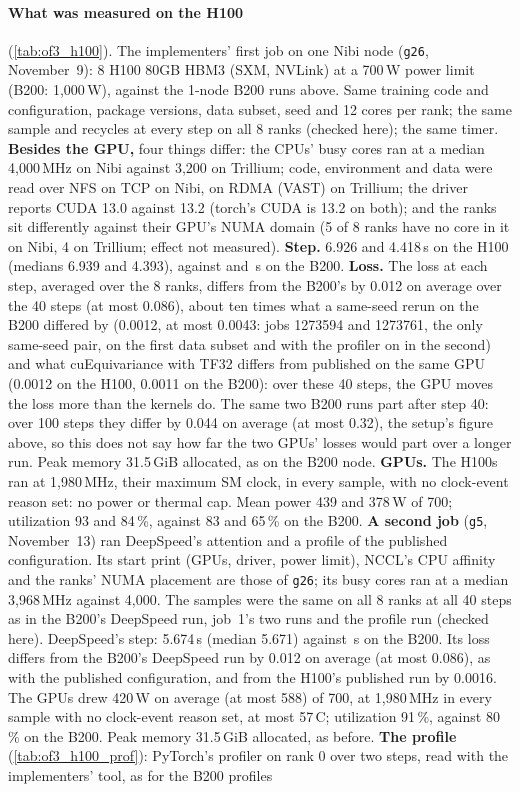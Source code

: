\paragraph{What was measured on the H100} (\cref{tab:of3_h100}). The implementers' first job on one Nibi node (\texttt{g26}, November~9): 8 H100 80GB HBM3 (SXM, NVLink) at a 700\,W power limit (B200: 1,000\,W), against the 1-node B200 runs above. Same training code and configuration, package versions, data subset, seed and 12 cores per rank; the same sample and recycles at every step on all 8 ranks (checked here); the same timer. \textbf{Besides the GPU,} four things differ: the CPUs' busy cores ran at a median 4,000\,MHz on Nibi against 3,200 on Trillium; code, environment and data were read over NFS on TCP on Nibi, on RDMA (VAST) on Trillium; the driver reports CUDA 13.0 against 13.2 (torch's CUDA is 13.2 on both); and the ranks sit differently against their GPU's NUMA domain (5 of 8 ranks have no core in it on Nibi, 4 on Trillium; effect not measured). \textbf{Step.} 6.926 and 4.418\,s on the H100 (medians 6.939 and 4.393), against \TriOfStepPubOne{} and \TriOfStepCueqOne\,s on the B200. \textbf{Loss.} The loss at each step, averaged over the 8 ranks, differs from the B200's by 0.012 on average over the 40 steps (at most 0.086), about ten times what a same-seed rerun on the B200 differed by (0.0012, at most 0.0043: jobs 1273594 and 1273761, the only same-seed pair, on the first data subset and with the profiler on in the second) and what cuEquivariance with TF32 differs from published on the same GPU (0.0012 on the H100, 0.0011 on the B200): over these 40 steps, the GPU moves the loss more than the kernels do. The same two B200 runs part after step 40: over 100 steps they differ by 0.044 on average (at most 0.32), the setup's figure above, so this does not say how far the two GPUs' losses would part over a longer run. Peak memory 31.5\,GiB allocated, as on the B200 node. \textbf{GPUs.} The H100s ran at 1,980\,MHz, their maximum SM clock, in every sample, with no clock-event reason set: no power or thermal cap. Mean power 439 and 378\,W of 700; utilization 93 and 84\,\%, against 83 and 65\,\% on the B200. \textbf{A second job} (\texttt{g5}, November~13) ran DeepSpeed's attention and a profile of the published configuration. Its start print (GPUs, driver, power limit), NCCL's CPU affinity and the ranks' NUMA placement are those of \texttt{g26}; its busy cores ran at a median 3,968\,MHz against 4,000. The samples were the same on all 8 ranks at all 40 steps as in the B200's DeepSpeed run, job~1's two runs and the profile run (checked here). DeepSpeed's step: 5.674\,s (median 5.671) against \TriOfStepDsOne\,s on the B200. Its loss differs from the B200's DeepSpeed run by 0.012 on average (at most 0.086), as with the published configuration, and from the H100's published run by 0.0016. The GPUs drew 420\,W on average (at most 588) of 700, at 1,980\,MHz in every sample with no clock-event reason set, at most 57\,\textdegree{}C; utilization 91\,\%, against 80\,\% on the B200. Peak memory 31.5\,GiB allocated, as before. \textbf{The profile} (\cref{tab:of3_h100_prof}): PyTorch's profiler on rank 0 over two steps, read with the implementers' tool, as for the B200 profiles 